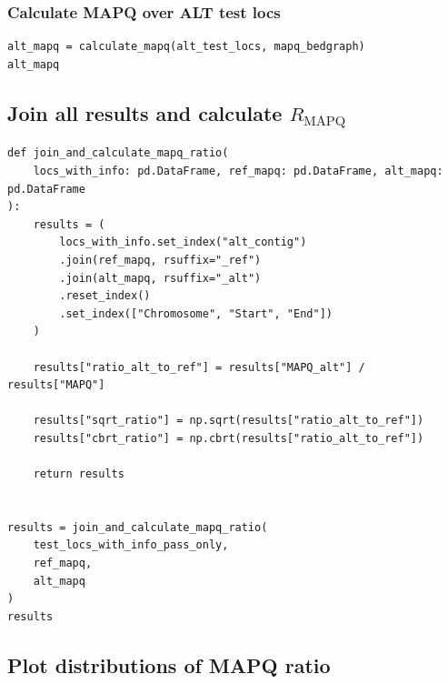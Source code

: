 \documentclass{article}
\begin{document}
\subsubsection{Calculate MAPQ over ALT test locs}

\begin{verbatim}
alt_mapq = calculate_mapq(alt_test_locs, mapq_bedgraph)
alt_mapq
\end{verbatim}

\subsection{Join all results and calculate $R_{\text{MAPQ}}$}

\begin{verbatim}
def join_and_calculate_mapq_ratio(
    locs_with_info: pd.DataFrame, ref_mapq: pd.DataFrame, alt_mapq: pd.DataFrame
):
    results = (
        locs_with_info.set_index("alt_contig")
        .join(ref_mapq, rsuffix="_ref")
        .join(alt_mapq, rsuffix="_alt")
        .reset_index()
        .set_index(["Chromosome", "Start", "End"])
    )

    results["ratio_alt_to_ref"] = results["MAPQ_alt"] / results["MAPQ"]

    results["sqrt_ratio"] = np.sqrt(results["ratio_alt_to_ref"])
    results["cbrt_ratio"] = np.cbrt(results["ratio_alt_to_ref"])

    return results


results = join_and_calculate_mapq_ratio(
    test_locs_with_info_pass_only,
    ref_mapq,
    alt_mapq
)
results
\end{verbatim}

\subsection{Plot distributions of MAPQ ratio}
\end{document}
